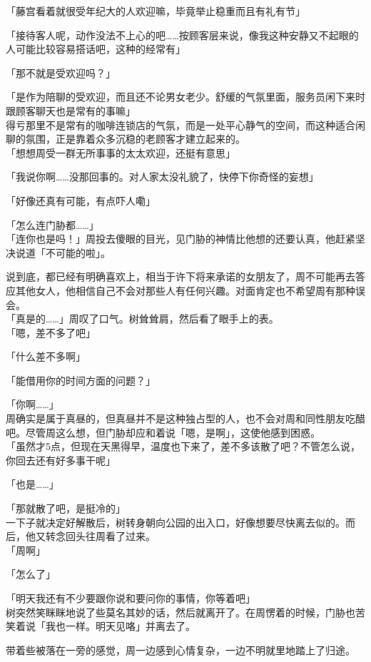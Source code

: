 「藤宫看着就很受年纪大的人欢迎嘛，毕竟举止稳重而且有礼有节」

「接待客人呢，动作没法不上心的吧……按顾客层来说，像我这种安静又不起眼的人可能比较容易搭话吧，这种的经常有」

「那不就是受欢迎吗？」

「是作为陪聊的受欢迎，而且还不论男女老少。舒缓的气氛里面，服务员闲下来时跟顾客聊天也是常有的事嘛」\\

得亏那里不是常有的咖啡连锁店的气氛，而是一处平心静气的空间，而这种适合闲聊的氛围，正是靠着众多沉稳的老顾客才建立起来的。\\

「想想周受一群无所事事的太太欢迎，还挺有意思」

「我说你啊……没那回事的。对人家太没礼貌了，快停下你奇怪的妄想」

「好像还真有可能，有点吓人嘞」

「怎么连门胁都……」\\

「连你也是吗！」周投去傻眼的目光，见门胁的神情比他想的还要认真，他赶紧坚决说道「不可能的啦」。

说到底，都已经有明确喜欢上，相当于许下将来承诺的女朋友了，周不可能再去答应其他女人，他相信自己不会对那些人有任何兴趣。对面肯定也不希望周有那种误会。\\

「真是的……」周叹了口气。树耸耸肩，然后看了眼手上的表。\\

「嗯，差不多了吧」

「什么差不多啊」

「能借用你的时间方面的问题？」

「你啊……」\\

周确实是属于真昼的，但真昼并不是这种独占型的人，也不会对周和同性朋友吃醋吧。尽管周这么想，但门胁却应和着说「嗯，是啊」，这使他感到困惑。\\

「虽然才5点，但现在天黑得早，温度也下来了，差不多该散了吧？不管怎么说，你回去还有好多事干呢」

「也是……」

「那就散了吧，是挺冷的」\\

一下子就决定好解散后，树转身朝向公园的出入口，好像想要尽快离去似的。而后，他又转念回头往周看了过来。\\

「周啊」

「怎么了」

「明天我还有不少要跟你说和要问你的事情，你等着吧」\\

树突然笑眯眯地说了些莫名其妙的话，然后就离开了。在周愣着的时候，门胁也苦笑着说「我也一样。明天见咯」并离去了。

带着些被落在一旁的感觉，周一边感到心情复杂，一边不明就里地踏上了归途。
